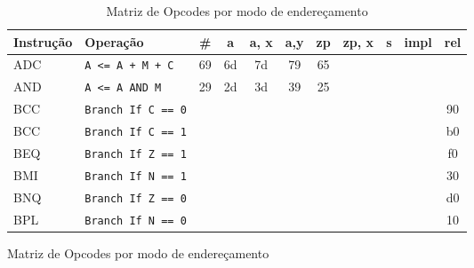 \documentclass[
	12pt,				  %
	openright,		%
	a4paper,			%
	english,			%
	french,				%
	spanish,			%
	brazil,				%
]{abntex2}
\newcommand{\codenobg}[1]{\texttt{#1}}
\begin{document}
\begin{figure}
	\fontsize{9}{11}\selectfont
	\begin{longtable}{|l|p{4cm}|c|c|c|c|c|c|c|c|c|}
		\caption{Matriz de Opcodes por modo de endereçamento} \label{tab:instSet}                                                                                                                  \\
		\hline
		\textbf{Instrução} & \textbf{Operação}             & \textbf{\#} & \textbf{a}    & \textbf{a, x} & \textbf{a,y} & \textbf{zp} & \textbf{zp, x} & \textbf{s} & \textbf{impl} & \textbf{rel} \\ \hline
		ADC                & \codenobg{A <= A + M + C}     & 69          & 6d            & 7d            & 79           & 65          &                &            &               &              \\ \hline
		AND                & \codenobg{A <= A AND M}       & 29          & 2d            & 3d            & 39           & 25          &                &            &               &              \\ \hline
		BCC                & \codenobg{Branch If C == 0}   &             &               &               &              &             &                &            &               & 90           \\ \hline
		BCC                & \codenobg{Branch If C == 1}   &             &               &               &              &             &                &            &               & b0           \\ \hline
		BEQ                & \codenobg{Branch If Z == 1}   &             &               &               &              &             &                &            &               & f0           \\ \hline
		BMI                & \codenobg{Branch If N == 1}   &             &               &               &              &             &                &            &               & 30           \\ \hline
		BNQ                & \codenobg{Branch If Z == 0}   &             &               &               &              &             &                &            &               & d0           \\ \hline
		BPL                & \codenobg{Branch If N == 0}   &             &               &               &              &             &                &            &               & 10           \\ \hline

\end{longtable}
\end{figure}
\end{document}
